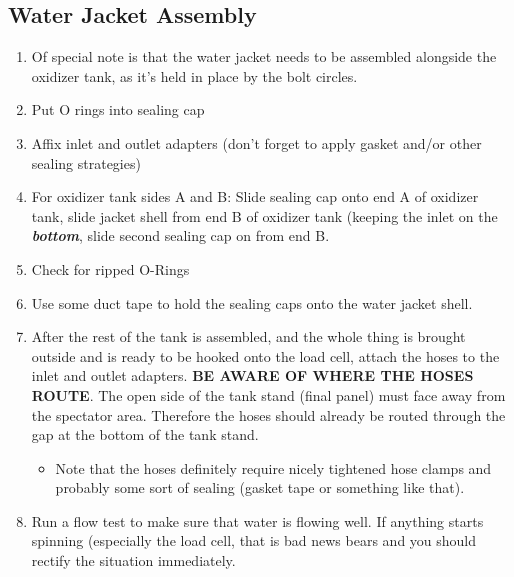 \documentclass[11pt]{article}
\begin{document}
\subsection{Water Jacket Assembly}

\begin{enumerate}
	\item Of special note is that the water jacket needs to be assembled alongside the oxidizer tank, as it's held in place by the bolt circles.
	\item Put O rings into sealing cap
	\item Affix inlet and outlet adapters (don't forget to apply gasket and/or other sealing strategies)
	\item For oxidizer tank sides A and B: Slide sealing cap onto end A of oxidizer tank, slide jacket shell from end B of oxidizer tank (keeping the inlet on the \textbf{\textit{bottom}}, slide second sealing cap on from end B.
	\item Check for ripped O-Rings
	\item Use some duct tape to hold the sealing caps onto the water jacket shell.
	\item After the rest of the tank is assembled, and the whole thing is brought outside and is ready to be hooked onto the load cell, attach the hoses to the inlet and outlet adapters. \textbf{BE AWARE OF WHERE THE HOSES ROUTE}. The open side of the tank stand (final panel) must face away from the spectator area. Therefore the hoses should already be routed through the gap at the bottom of the tank stand.
		\begin{itemize}
			\item Note that the hoses definitely require nicely tightened hose clamps and probably some sort of sealing (gasket tape or something like that).
		\end{itemize}
	\item Run a flow test to make sure that water is flowing well. If anything starts spinning (especially the load cell, that is bad news bears and you should rectify the situation immediately.
\end{enumerate}
\end{document}

